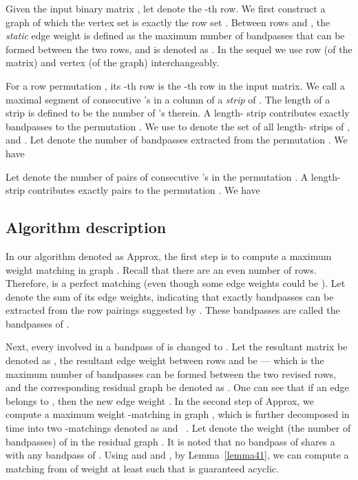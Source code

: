\documentclass[11pt,twoside]{article}\usepackage{amssymb,latexsym,graphicx,hyperref}\usepackage{epstopdf}
\begin{document}
Given the input binary matrix , let  denote the -th row.
We first construct a graph  of which the vertex set is exactly the row set .
Between rows  and , the {\em static} edge weight is defined as the maximum number of bandpasses that can be formed between the two rows,
and is denoted as .
In the sequel we use row (of the matrix) and vertex (of the graph) interchangeably.


For a row permutation , its -th row is the -th row in the input matrix.
We call a maximal segment of consecutive 's in a column of  a {\em strip} of .
The length of a strip is defined to be the number of 's therein.
A length- strip contributes exactly  bandpasses to the permutation .
We use  to denote the set of all length- strips of , and .
Let  denote the number of bandpasses extracted from the permutation .
We have

Let  denote the number of pairs of consecutive 's in the permutation .
A length- strip contributes exactly  pairs to the permutation .
We have



\subsection{Algorithm description}
In our algorithm denoted as {\sc Approx}, the first step is to compute a maximum weight matching  in graph .
Recall that there are an even number of rows.
Therefore,  is a perfect matching (even though some edge weights could be ).
Let  denote the sum of its edge weights, indicating that exactly  bandpasses can be extracted from the row pairings suggested by .
These bandpasses are called the bandpasses of .


Next, every  involved in a bandpass of  is changed to .
Let the resultant matrix be denoted as ,
the resultant edge weight between rows  and  be 
--- which is the maximum number of bandpasses can be formed between the two revised rows,
and the corresponding residual graph be denoted as .
One can see that if an edge  belongs to , then the new edge weight .
In the second step of {\sc Approx}, we compute a maximum weight -matching  in graph ,
which is further decomposed in  time into two -matchings denoted as  and ~\cite{Har69,Die05}.
Let  denote the weight (the number of bandpasses) of  in the residual graph .
It is noted that no bandpass of  shares a  with any bandpass of .
Using  and  and , by Lemma~\ref{lemma41},
we can compute a matching  from  of weight at least  such that  is guaranteed acyclic.
\end{document}
